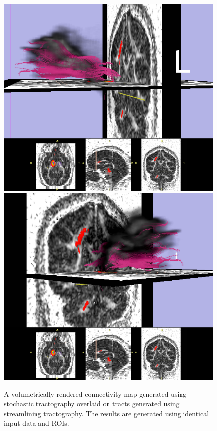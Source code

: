 \begin{figure}
  \center
	  \includegraphics[width=0.75\linewidth]
	    {slicer-0015}
	  \includegraphics[width=0.75\linewidth]
	    {slicer-0017}
	\caption{A volumetrically rendered connectivity map generated using stochastic tractography overlaid on tracts generated using streamlining tractography.  The results are generated using identical input data and ROIs.}
	\label{fig:streamlinestochastic}
\end{figure}

